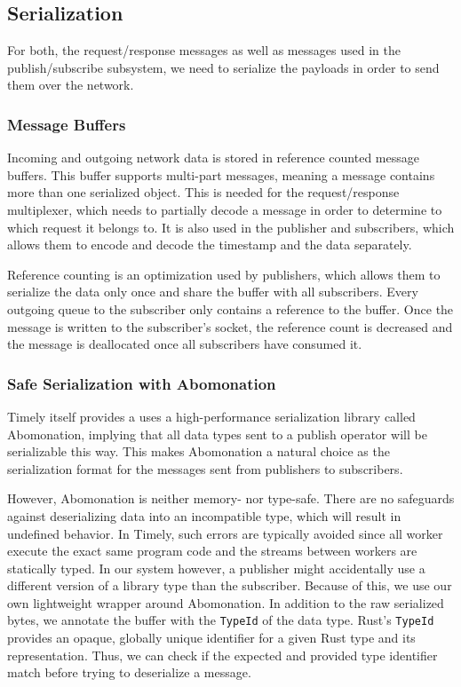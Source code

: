 \subsection{Serialization} \label{sec:serialization}

For both, the request/response messages as well as messages used in the publish/subscribe
subsystem, we need to serialize the payloads in order to send them over the network.

\subsubsection{Message Buffers}

Incoming and outgoing network data is stored in reference counted message buffers.
This buffer supports multi-part messages, meaning a message contains more than
one serialized object. This is needed for the request/response multiplexer, which
needs to partially decode a message in order to determine to which request it
belongs to. It is also used in the publisher and subscribers, which allows them
to encode and decode the timestamp and the data separately.

Reference counting is an optimization used by publishers, which allows them to
serialize the data only once and share the buffer with all subscribers. Every
outgoing queue to the subscriber only contains a reference to the buffer. Once
the message is written to the subscriber's socket, the reference count is
decreased and the message is deallocated once all subscribers have consumed it.

\subsubsection{Safe Serialization with Abomonation}

Timely itself provides a uses a high-performance serialization library called
Abomonation, implying that all data types sent to a publish operator will be
serializable this way. This makes Abomonation a natural choice as the serialization
format for the messages sent from publishers to subscribers. 

However, Abomonation is neither memory- nor type-safe. There are no safeguards
against deserializing data into an incompatible type, which will result in undefined
behavior. In Timely, such errors are typically avoided since all worker
execute the exact same program code and the streams between workers are
statically typed. In our system however, a publisher might accidentally use
a different version of a library type than the subscriber. Because of this,
we use our own lightweight wrapper around Abomonation. In addition to the raw
serialized bytes, we annotate the buffer with the \lstinline{TypeId} of the
data type. Rust's \lstinline{TypeId} provides an opaque, globally unique
identifier for a given Rust type and its representation. Thus, we can check
if the expected and provided type identifier match before trying to deserialize
a message.

